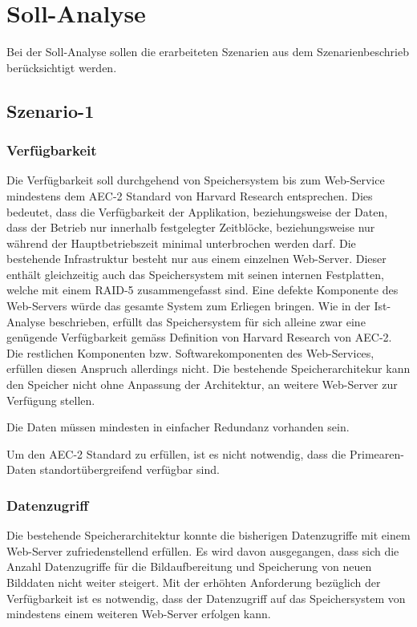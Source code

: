 \cleardoublepage
\chapter{Soll-Analyse}
Bei der Soll-Analyse sollen die erarbeiteten Szenarien aus dem Szenarienbeschrieb berücksichtigt werden. 

\section{Szenario-1}\label{Szenario-1}

\subsection{Verfügbarkeit}
Die Verfügbarkeit soll durchgehend von Speichersystem bis zum Web-Service mindestens dem AEC-2 Standard von Harvard Research entsprechen. Dies bedeutet, dass die Verfügbarkeit der Applikation, beziehungsweise der Daten, dass der Betrieb nur innerhalb festgelegter Zeitblöcke, beziehungsweise nur während der Hauptbetriebszeit minimal unterbrochen werden darf. Die bestehende Infrastruktur besteht nur aus einem einzelnen Web-Server. Dieser enthält gleichzeitig auch das Speichersystem mit seinen internen Festplatten, welche mit einem RAID-5 zusammengefasst sind. Eine defekte Komponente des Web-Servers würde das gesamte System zum Erliegen bringen. Wie in der Ist-Analyse beschrieben, erfüllt das Speichersystem für sich alleine zwar eine genügende Verfügbarkeit gemäss Definition von Harvard Research von AEC-2. Die restlichen Komponenten bzw. Softwarekomponenten des Web-Services, erfüllen diesen Anspruch allerdings nicht. Die bestehende Speicherarchitekur kann den Speicher nicht ohne Anpassung der Architektur, an weitere Web-Server zur Verfügung stellen.

Die Daten müssen mindesten in einfacher Redundanz vorhanden sein. 

Um den AEC-2 Standard zu erfüllen, ist es nicht notwendig, dass die \gls{Primearen-Daten} standortübergreifend verfügbar sind.

\subsection{Datenzugriff}
Die bestehende Speicherarchitektur konnte die bisherigen Datenzugriffe mit einem Web-Server zufriedenstellend erfüllen. Es wird davon ausgegangen, dass sich die Anzahl Datenzugriffe für die Bildaufbereitung und Speicherung von neuen Bilddaten nicht weiter steigert. Mit der erhöhten Anforderung bezüglich der Verfügbarkeit ist es notwendig, dass der Datenzugriff auf das Speichersystem von mindestens einem weiteren Web-Server erfolgen kann. 

